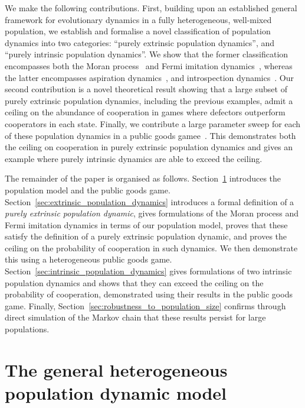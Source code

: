 \documentclass{article}
\begin{document}
We make the following contributions. First, building upon an established general
framework for evolutionary dynamics in a fully heterogeneous, well-mixed
population, we establish and formalise a novel classification of population
dynamics into two categories: ``purely extrinsic population dynamics'', and
``purely intrinsic population dynamics''. We show that the former classification
encompasses both the Moran process~\cite{knight2018evolution,Moran_1958} and
Fermi imitation dynamics~\cite{PhysRevE.58.69}, whereas the latter encompasses
aspiration dynamics~\cite{du2014aspiration}, and introspection
dynamics~\cite{Couto2022, Couto2023}. Our second contribution is a novel
theoretical result showing that a large subset of purely extrinsic population
dynamics, including the previous examples, admit a ceiling on the abundance of
cooperation in games where defectors outperform cooperators in each state.
Finally, we contribute a large parameter sweep for each of these population
dynamics in a public goods gamee~\cite{ARCHETTI20129, hauert2002volunteering,
HauertDynamics2004, hauser2019social, calc_of_selfishness}. This demonstrates
both the ceiling on cooperation in purely extrinsic population dynamics and
gives an example where purely intrinsic dynamics are able to exceed the ceiling.

The remainder of the paper is organised as follows.
Section~\ref{sec:the_general_heterogeneous_population_dynamic_model} introduces
the population model and the public goods game.
Section~\ref{sec:extrinsic_population_dynamics} introduces a formal definition
of a \emph{purely extrinsic population dynamic}, gives formulations of the Moran
process and Fermi imitation dynamics in terms of our population model, proves
that these satisfy the definition of a purely extrinsic population dynamic, and
proves the ceiling on the probability of cooperation in such dynamics. We then
demonstrate this using a heterogeneous public goods game.
Section~\ref{sec:intrinsic_population_dynamics} gives formulations of two
intrinsic population dynamics and shows that they can exceed the ceiling on the
probability of cooperation, demonstrated using their results in the public goods
game. Finally, Section~\ref{sec:robustness_to_population_size} confirms through
direct simulation of the Markov chain that these results persist for large
populations.

\section{The general heterogeneous population dynamic model}
\label{sec:the_general_heterogeneous_population_dynamic_model}
\end{document}
